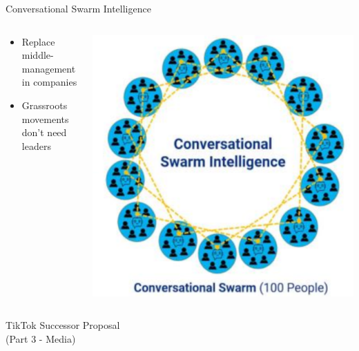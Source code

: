 \documentclass[aspectratio=169]{beamer}
\begin{document}
\begin{frame}{Conversational Swarm Intelligence}
\begin{columns}[T]
    \begin{column}[T]{0.5\textwidth}
        \begin{itemize}
            \item Replace middle-management in companies
            \item Grassroots movements don't need leaders
        \end{itemize}
    \end{column}
    \begin{column}{0.5\textwidth}
        \includegraphics[height=0.8\textheight]{imgs/CSI_section/conversational_swarm.png}
    \end{column}
\end{columns}
\end{frame}

\begin{frame}
    \centering
    \Huge TikTok Successor Proposal \\
    \Huge (Part 3 - Media)
\end{frame}
\end{document}
